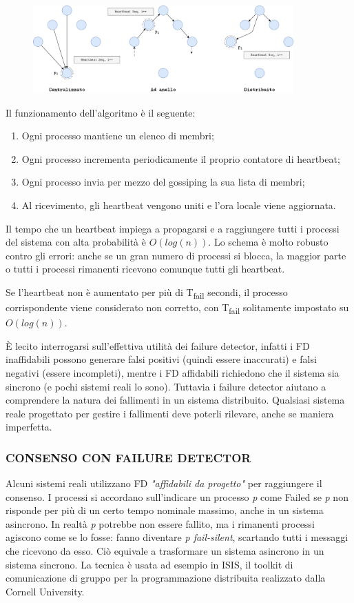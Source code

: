 \begin{figure}[ht]
    \centering
    \includegraphics[width=10cm]{./Images/cap2/2.21.png}
\end{figure}

Il funzionamento dell'algoritmo è il seguente:
\begin{enumerate}
    \item Ogni processo mantiene un elenco di membri;
    \item Ogni processo incrementa periodicamente il proprio contatore di heartbeat;
    \item Ogni processo invia per mezzo del gossiping la sua lista di membri;
    \item Al ricevimento, gli heartbeat vengono uniti e l'ora locale viene aggiornata.
\end{enumerate}
Il tempo che un heartbeat impiega a propagarsi e a raggiungere tutti i processi del sistema con alta probabilità è $O(log(n))$. Lo schema è molto robusto contro gli errori: anche se un gran numero di processi si blocca, la maggior parte o tutti i processi rimanenti ricevono comunque tutti gli heartbeat.

Se l'heartbeat non è aumentato per più di T\textsubscript{fail} secondi, il processo corrispondente viene considerato non corretto, con T\textsubscript{fail} solitamente impostato su $O(log(n))$.

È lecito interrogarsi sull'effettiva utilità dei failure detector, infatti i FD inaffidabili possono generare falsi positivi (quindi essere inaccurati) e falsi negativi (essere incompleti), mentre i FD affidabili richiedono che il sistema sia sincrono (e pochi sistemi reali lo sono). Tuttavia i failure detector aiutano a comprendere la natura dei fallimenti in un sistema distribuito. Qualsiasi sistema reale progettato per gestire i fallimenti deve poterli rilevare, anche se maniera imperfetta.

\subsubsection{CONSENSO CON FAILURE DETECTOR}
Alcuni sistemi reali utilizzano FD \textit{"affidabili da progetto"} per raggiungere il consenso. I processi si accordano sull'indicare un processo \textit{p} come Failed se \textit{p} non risponde per più di un certo tempo nominale massimo, anche in un sistema asincrono. In realtà \textit{p} potrebbe non essere fallito, ma i rimanenti processi agiscono come se lo fosse: fanno diventare \textit{p fail-silent}, scartando tutti i messaggi che ricevono da esso. Ciò equivale a trasformare un sistema asincrono in un sistema sincrono. La tecnica è usata ad esempio in ISIS, il toolkit di comunicazione di gruppo per la programmazione distribuita realizzato dalla Cornell University.

